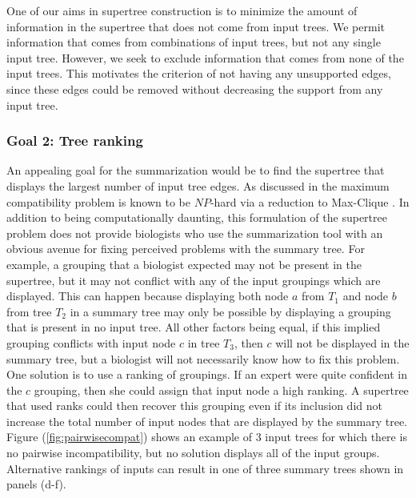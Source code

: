 \documentclass[fleqn,12pt,lineno,english]{wlpeerj}
\begin{document}
One of our aims in supertree construction is to minimize the amount
of information in the supertree that does not come from input trees.
We permit information that comes from combinations of input trees,
but not any single input tree. However, we seek to exclude information
that comes from none of the input trees. This motivates the criterion
of not having any unsupported edges, since these edges could be removed
without decreasing the support from any input tree.

\subsubsection{Goal 2: Tree ranking}

An appealing goal for the summarization would be to find the supertree
that displays the largest number of input tree edges. As discussed
in \citet[pages 92 and 131;][]{HusonRS2010} the maximum compatibility
problem is known to be $NP$-hard via a reduction to Max-Clique \citep{Karp1972}.
In addition to being computationally daunting, this formulation of
the supertree problem does not provide biologists who use the summarization
tool with an obvious avenue for fixing perceived problems with the
summary tree. For example, a grouping that a biologist expected may
not be present in the supertree, but it may not conflict with any
of the input groupings which are displayed. This can happen because
displaying both node $a$ from $T_{1}$ and node $b$ from tree $T_{2}$
in a summary tree may only be possible by displaying a grouping that
is present in no input tree. All other factors being equal, if this
implied grouping conflicts with input node $c$ in tree $T_{3}$,
then $c$ will not be displayed in the summary tree, but a biologist
will not necessarily know how to fix this problem. One solution is
to use a ranking of groupings. If an expert were quite confident in
the $c$ grouping, then she could assign that input node a high ranking.
A supertree that used ranks could then recover this grouping even
if its inclusion did not increase the total number of input nodes
that are displayed by the summary tree. Figure (\ref{fig:pairwisecompat})
shows an example of 3 input trees for which there is no pairwise incompatibility,
but no solution displays all of the input groups. Alternative rankings
of inputs can result in one of three summary trees shown in panels
(d-f). 
\end{document}
